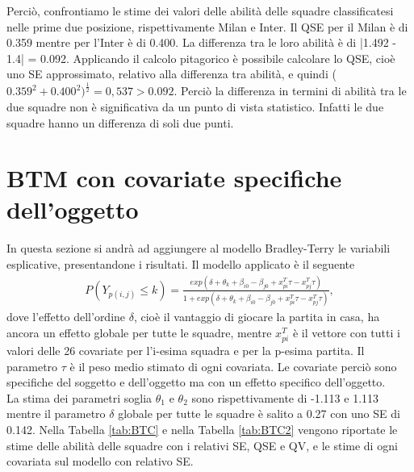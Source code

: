 Perciò, confrontiamo le stime dei valori delle abilità delle squadre classificatesi nelle prime due posizione, rispettivamente Milan e Inter. Il QSE per il Milan è di 0.359 mentre per l'Inter è di 0.400. La differenza tra le loro abilità è di |1.492 - 1.4| = 0.092. Applicando il calcolo pitagorico è possibile calcolare lo QSE, cioè uno SE approssimato, relativo alla differenza tra abilità, e quindi ($0.359^2 + 0.400^2)^\frac{1}{2}=0,537 > 0.092$. Perciò la differenza in termini di abilità tra le due squadre non è significativa da un punto di vista statistico. Infatti le due squadre hanno un differenza di soli due punti.

\section{BTM con covariate specifiche dell'oggetto}
In questa sezione si andrà ad aggiungere al modello Bradley-Terry le variabili esplicative, presentandone i risultati. Il modello applicato è il seguente
\begin{align}
	P(Y_{p(i,j)}\leq k) =  \frac{exp(\delta + \theta_{k} + \beta_{i0} - \beta_{j0} + x^T_{pi}\tau - x^T_{pj}\tau)}{1 + exp(\delta + \theta_{k} + \beta_{i0} - \beta_{j0} + x^T_{pi}\tau - x^T_{pj}\tau)}, \label{for:5.1}
\end{align}
dove l'effetto dell'ordine $\delta$, cioè il vantaggio di giocare la partita in casa, ha ancora un effetto globale per tutte le squadre, mentre $x^T_{pi}$ è il vettore con tutti i valori delle 26 covariate per l'i-esima squadra e per la p-esima partita. Il parametro $\tau$ è il peso medio stimato di ogni covariata. Le covariate perciò sono specifiche del soggetto e dell'oggetto ma con un effetto specifico dell'oggetto.\\
La stima dei parametri soglia $\theta_1$ e $\theta_2$ sono rispettivamente di -1.113 e 1.113 mentre il parametro $\delta$ globale per tutte le squadre è salito a 0.27 con uno SE di 0.142. Nella Tabella \ref{tab:BTC} e nella Tabella \ref{tab:BTC2} vengono riportate le stime delle abilità delle squadre con i relativi SE, QSE e QV, e le stime di ogni covariata sul modello con relativo SE.\\
